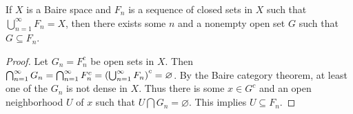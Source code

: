 \begin{proposition}\label{prop:Baire}
    If $X$ is a Baire space and $F_n$ is a sequence of closed sets in $X$ such that 
    $\bigcup_{n=1}^\infty F_n = X$, then there exists some $n$ and a nonempty open 
    set $G$ such that $G \subseteq F_n$.
\end{proposition}
\begin{proof}
    Let $G_n = F_n^c$ be open sets in $X$. Then $\bigcap_{n=1}^\infty G_n 
    = \bigcap_{n=1}^\infty F_n^c = \pth{\bigcup_{n=1}^\infty F_n}^c = \varnothing$. 
    By the Baire category theorem, at least one of the $G_n$ is not dense in $X$. 
    Thus there is some $x\in G^c$ and an open neighborhood $U$ of $x$ such that 
    $U\bigcap G_n = \varnothing$. This implies $U\subseteq F_n$.
\end{proof}

